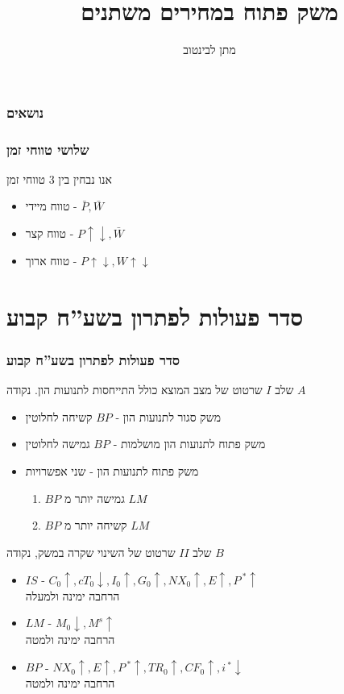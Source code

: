 \documentclass[dvipsnames]{beamer}
\title[]{משק פתוח במחירים משתנים}
\author{מתן לבינטוב}
\institute[{{ אב"ג}}]{{ אוניברסיטת בן גוריון בנגב}}
\date{}
\begin{document}
\begin{RTL}
\begin{frame}
\titlepage
\end{frame}
\begin{frame}
    \frametitle{נושאים}
    \tableofcontents
    

\end{frame}


\begin{frame}
    \frametitle{שלושי טווחי זמן}
    אנו נבחין בין 3 טווחי זמן
    \begin{itemize}
        \item טווח מיידי - $\bar{P} , \bar{W}$
        \item טווח קצר - $P \uparrow \downarrow, \bar{W}$
        \item טווח ארוך - $P \uparrow \downarrow, W \uparrow \downarrow$
    \end{itemize}

    

\end{frame}

\section{סדר פעולות לפתרון בשע''ח קבוע}
\begin{frame}[allowframebreaks]
    \frametitle{סדר פעולות לפתרון בשע''ח קבוע}
    \begin{block}{שלב $I$}
        שרטוט של מצב המוצא כולל התייחסות לתנועות הון. נקודה $A$
        \begin{itemize}
            \item משק סגור לתנועות הון - $BP$ קשיחה לחלוטין
            \item משק פתוח לתנועות הון מושלמות - $BP$ גמישה לחלוטין
            \item משק פתוח לתנועות הון - שני אפשרויות
            \begin{enumerate}
                \item $BP$ גמישה יותר מ $LM$
                \item $BP$ קשיחה יותר מ $LM$
            \end{enumerate}
        \end{itemize}
    \end{block}

    \begin{block}{שלב $II$}
        שרטוט של השינוי שקרה במשק, נקודה $B$
        \begin{itemize}
            \item $IS$ - $C_0 \uparrow ,cT_0 \downarrow ,I_0 \uparrow ,G_0 \uparrow ,NX_0 \uparrow ,E \uparrow ,P^{\ *} \uparrow$ \\ הרחבה ימינה ולמעלה
            \item $LM$ - $M_0 \downarrow , M^s \uparrow$ \\ הרחבה ימינה ולמטה
            \item $BP$ - $NX_0 \uparrow , E \uparrow , P^{\ *} \uparrow , TR_0 \uparrow, CF_0 \uparrow, i^{\ *} \downarrow$ \\ הרחבה ימינה ולמטה
        \end{itemize}
    \end{block}
    

\end{frame}
\end{RTL}
\end{document}
